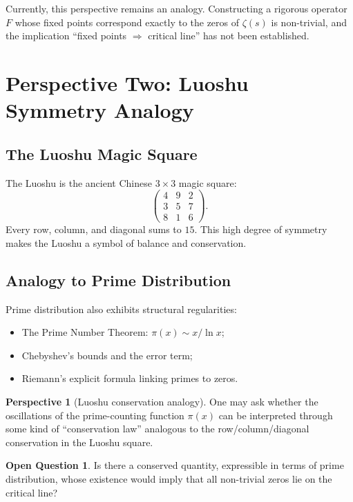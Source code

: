 \documentclass[11pt,a4paper]{article}
\theoremstyle{definition}
\newtheorem{question}{Open Question}[section]
\newtheorem{perspective}{Perspective}[section]
\begin{document}
Currently, this perspective remains an analogy. Constructing a rigorous operator $F$ whose fixed points correspond exactly to the zeros of $\zeta(s)$ is non-trivial, and the implication ``fixed points $\Rightarrow$ critical line'' has not been established.

\section{Perspective Two: Luoshu Symmetry Analogy}

\subsection{The Luoshu Magic Square}

The Luoshu is the ancient Chinese $3 \times 3$ magic square:
\begin{equation}
\begin{pmatrix}
4 & 9 & 2 \\
3 & 5 & 7 \\
8 & 1 & 6
\end{pmatrix}.
\end{equation}
Every row, column, and diagonal sums to $15$. This high degree of symmetry makes the Luoshu a symbol of balance and conservation.

\subsection{Analogy to Prime Distribution}

Prime distribution also exhibits structural regularities:

\begin{itemize}
    \item The Prime Number Theorem: $\pi(x) \sim x / \ln x$;
    \item Chebyshev's bounds and the error term;
    \item Riemann's explicit formula linking primes to zeros.
\end{itemize}

\begin{perspective}[Luoshu conservation analogy]
One may ask whether the oscillations of the prime-counting function $\pi(x)$ can be interpreted through some kind of ``conservation law'' analogous to the row/column/diagonal conservation in the Luoshu square.
\end{perspective}

\begin{question}
Is there a conserved quantity, expressible in terms of prime distribution, whose existence would imply that all non-trivial zeros lie on the critical line?
\end{question}
\end{document}
